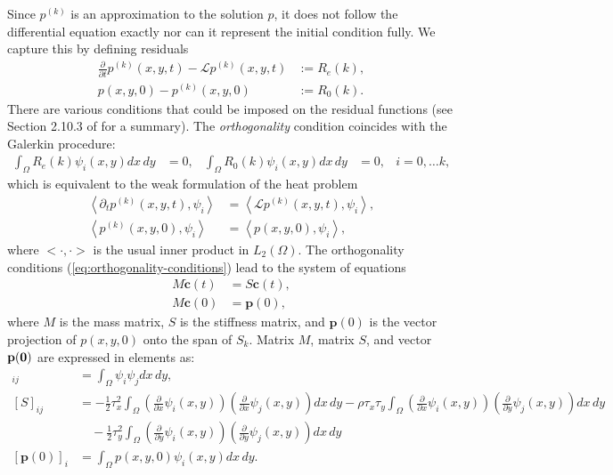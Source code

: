 \documentclass[10pt]{article}
\begin{document}
Since $p^{(k)}$ is an approximation to the solution $p$, it
does not follow the differential equation exactly nor can it represent
the initial condition fully. We capture this by defining residuals
\begin{align*}
  \frac{\partial}{\partial t} p^{(k)}(x,y,t) - \mathcal{L}p^{(k)}(x,y,t) &:= R_e(k), \\
  p(x,y,0) - p^{(k)}(x,y,0) &:= R_0(k).
\end{align*}
There are various conditions that could be imposed on the residual
functions (see Section 2.10.3 of \cite{norrie1973finite} for a
summary). The \textit{orthogonality} condition coincides with the
Galerkin procedure:
\begin{align}
  \displaystyle \int_{\Omega} R_e(k) \psi_i(x,y) dx\,dy &= 0,& \displaystyle \int_{\Omega} R_0(k) \psi_i(x,y) dx\,dy &= 0,& i = 0,\ldots k, \label{eq:orthogonality-conditions}
\end{align}
which is equivalent to the weak formulation of the heat problem
\begin{align*}
  \left< \partial_t p^{(k)}(x,y,t), \psi_i \right> &= \left<\mathcal{L}p^{(k)}(x,y,t), \psi_i \right>, \\
  \left< p^{(k)}(x,y,0), \psi_i \right> &= \left<p(x,y,0), \psi_i\right>,
\end{align*}
where $<\cdot, \cdot>$ is the usual inner product in
$L_2(\Omega)$. The orthogonality conditions
(\ref{eq:orthogonality-conditions}) lead to the system of equations
\begin{align}
  M \mathbf{\dot{c}}(t) &= S \mathbf{c}(t), \label{eq:orthogonality-conditions-mat-1}\\
  M \mathbf{c}(0) &= \mathbf{p}(0), \label{eq:orthogonality-conditions-mat-2}
\end{align}
where $M$ is the mass matrix, $S$ is the stiffness matrix, and
$\mathbf{p}(0)$ is the vector projection of $p(x,y,0)$ onto the
span of $S_k$. Matrix $M$, matrix $S$, and vector $\bf{p}(0)$ are expressed in elements as:
\begin{align*}
  [M]_{ij} &= \displaystyle \int_\Omega \psi_i \psi_j dx\,dy, \\
  [S]_{ij} &= -\frac{1}{2}\tau_x^2 \displaystyle \int_\Omega \left( \frac{\partial}{\partial x} \psi_i(x,y) \right) \left( \frac{\partial}{\partial x} \psi_j(x,y) \right) dx\,dy -\rho\tau_x\tau_y \displaystyle \int_\Omega \left( \frac{\partial}{\partial x} \psi_i(x,y) \right) \left( \frac{\partial}{\partial y} \psi_j(x,y) \right) dx\,dy \\
         &\quad -\frac{1}{2}\tau_y^2 \displaystyle \int_\Omega \left( \frac{\partial}{\partial y} \psi_i(x,y) \right) \left( \frac{\partial}{\partial y} \psi_j(x,y) \right) dx\,dy \\
  [\mathbf{p}(0)]_i &= \displaystyle \int_\Omega p(x,y,0) \psi_i(x,y) dx\,dy.
\end{align*}
\end{document}
